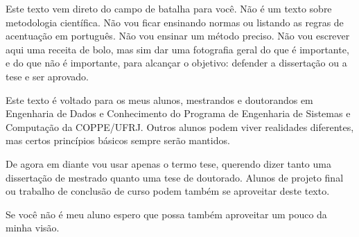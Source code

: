 Este texto vem direto do campo de batalha para você.
Não é um texto sobre metodologia científica. Não vou ficar ensinando normas ou listando as regras de acentuação em português. Não vou ensinar um método preciso. Não vou escrever aqui uma receita de bolo, mas sim dar uma fotografia geral do que é importante, e do que não é importante, para alcançar o objetivo: defender a dissertação ou a tese e ser aprovado.

Este texto é voltado para os meus alunos, mestrandos e doutorandos em Engenharia de Dados e Conhecimento do Programa de Engenharia de Sistemas e Computação da COPPE/UFRJ. Outros alunos podem viver realidades diferentes, mas certos princípios básicos sempre serão mantidos.

De agora em diante vou usar apenas o termo tese, querendo dizer tanto uma dissertação de mestrado quanto uma tese de doutorado. Alunos de projeto final ou trabalho de conclusão de curso podem também se aproveitar deste texto.

Se você não é meu aluno espero que possa também aproveitar um pouco da minha visão.

